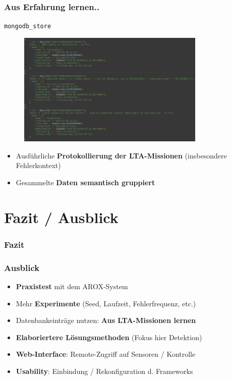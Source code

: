 \documentclass{beamer}
\newcommand{\code}[1]{\colorbox{light-gray}{\texttt{#1}}}
\begin{document}
\begin{frame}
  \frametitle{Aus Erfahrung lernen..}
  \code{mongodb\_store}
  \begin{figure}[H]
    \centering
    \includegraphics[width=0.8\textwidth]{img/database_entries.png}
  \end{figure}
  \begin{itemize}
    \item Ausführliche \textbf{Protokollierung der LTA-Missionen} (insbesondere Fehlerkontext)
    \item Gesammelte \textbf{Daten semantisch gruppiert}
  \end{itemize}
\end{frame}

\section{Fazit / Ausblick}

\begin{frame}
  \frametitle{Fazit}
\end{frame}

\begin{frame}
  \frametitle{Ausblick}
  \begin{itemize}
    \item \textbf{Praxistest} mit dem AROX-System
    \item Mehr \textbf{Experimente} (Seed, Laufzeit, Fehlerfrequenz, etc.)
    \item Datenbankeinträge nutzen: \textbf{Aus LTA-Missionen lernen}
    \item \textbf{Elaboriertere Lösungsmethoden} (Fokus hier Detektion)
    \item \textbf{Web-Interface}: Remote-Zugriff auf Sensoren / Kontrolle
    \item \textbf{Usability}: Einbindung / Rekonfiguration d. Frameworks
  \end{itemize}
\end{frame}

\begin{frame}[allowframebreaks]
  
  
\end{frame}
\end{document}
